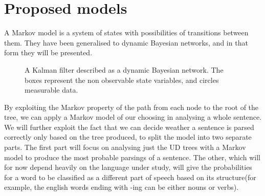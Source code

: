 \section{Proposed models}
A Markov model is a system of states with possibilities of transitions between them. They have been generalised to dynamic Bayesian networks, and in that form
they will be presented.
\begin{figure}[h!]
\center
{}
\label{kal}
\caption{A Kalman filter described as a dynamic Bayesian network. The boxes represent the non observable state variables, and circles measurable data.}
\end{figure}

By exploiting the Markov property of the path from each node to the root of the tree, we can apply a Markov model of our choosing in analysing a whole sentence.
We will further exploit the fact that we can decide weather a sentence is parsed correctly only based on the tree produced, to split the model into two separate
parts. The first part will focus on analysing just the UD trees with a Markov model to produce the most probable parsings of a sentence. The other, which will for now depend heavily on the language under study, will give the probabilities for a word to be classified as a different part of speech based on its structure(for example, the english words ending with -ing can be either nouns or verbs). 


\clearpage
